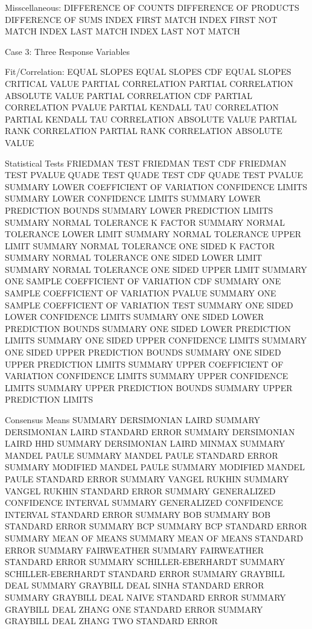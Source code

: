 Misscellaneous:
   DIFFERENCE OF COUNTS
   DIFFERENCE OF PRODUCTS
   DIFFERENCE OF SUMS
   INDEX FIRST MATCH
   INDEX FIRST NOT MATCH
   INDEX LAST MATCH
   INDEX LAST NOT MATCH

Case 3: Three Response Variables

Fit/Correlation:
   EQUAL SLOPES
   EQUAL SLOPES CDF
   EQUAL SLOPES CRITICAL VALUE
   PARTIAL CORRELATION
   PARTIAL CORRELATION ABSOLUTE VALUE
   PARTIAL CORRELATION CDF
   PARTIAL CORRELATION PVALUE
   PARTIAL KENDALL TAU CORRELATION
   PARTIAL KENDALL TAU CORRELATION ABSOLUTE VALUE
   PARTIAL RANK CORRELATION
   PARTIAL RANK CORRELATION ABSOLUTE VALUE

Statistical Tests
   FRIEDMAN TEST
   FRIEDMAN TEST CDF
   FRIEDMAN TEST PVALUE
   QUADE TEST
   QUADE TEST CDF
   QUADE TEST PVALUE
   SUMMARY LOWER COEFFICIENT OF VARIATION CONFIDENCE LIMITS
   SUMMARY LOWER CONFIDENCE LIMITS
   SUMMARY LOWER PREDICTION BOUNDS
   SUMMARY LOWER PREDICTION LIMITS
   SUMMARY NORMAL TOLERANCE K FACTOR
   SUMMARY NORMAL TOLERANCE LOWER LIMIT
   SUMMARY NORMAL TOLERANCE UPPER LIMIT
   SUMMARY NORMAL TOLERANCE ONE SIDED K FACTOR
   SUMMARY NORMAL TOLERANCE ONE SIDED LOWER LIMIT
   SUMMARY NORMAL TOLERANCE ONE SIDED UPPER LIMIT
   SUMMARY ONE SAMPLE COEFFICIENT OF VARIATION CDF
   SUMMARY ONE SAMPLE COEFFICIENT OF VARIATION PVALUE
   SUMMARY ONE SAMPLE COEFFICIENT OF VARIATION TEST
   SUMMARY ONE SIDED LOWER CONFIDENCE LIMITS
   SUMMARY ONE SIDED LOWER PREDICTION BOUNDS
   SUMMARY ONE SIDED LOWER PREDICTION LIMITS
   SUMMARY ONE SIDED UPPER CONFIDENCE LIMITS
   SUMMARY ONE SIDED UPPER PREDICTION BOUNDS
   SUMMARY ONE SIDED UPPER PREDICTION LIMITS
   SUMMARY UPPER COEFFICIENT OF VARIATION CONFIDENCE LIMITS
   SUMMARY UPPER CONFIDENCE LIMITS
   SUMMARY UPPER PREDICTION BOUNDS
   SUMMARY UPPER PREDICTION LIMITS

Consensus Means
   SUMMARY DERSIMONIAN LAIRD
   SUMMARY DERSIMONIAN LAIRD STANDARD ERROR
   SUMMARY DERSIMONIAN LAIRD HHD
   SUMMARY DERSIMONIAN LAIRD MINMAX
   SUMMARY MANDEL PAULE
   SUMMARY MANDEL PAULE STANDARD ERROR
   SUMMARY MODIFIED MANDEL PAULE
   SUMMARY MODIFIED MANDEL PAULE STANDARD ERROR
   SUMMARY VANGEL RUKHIN
   SUMMARY VANGEL RUKHIN STANDARD ERROR
   SUMMARY GENERALIZED CONFIDENCE INTERVAL
   SUMMARY GENERALIZED CONFIDENCE INTERVAL STANDARD ERROR
   SUMMARY BOB
   SUMMARY BOB STANDARD ERROR
   SUMMARY BCP
   SUMMARY BCP STANDARD ERROR
   SUMMARY MEAN OF MEANS
   SUMMARY MEAN OF MEANS STANDARD ERROR
   SUMMARY FAIRWEATHER
   SUMMARY FAIRWEATHER STANDARD ERROR
   SUMMARY SCHILLER-EBERHARDT
   SUMMARY SCHILLER-EBERHARDT STANDARD ERROR
   SUMMARY GRAYBILL DEAL
   SUMMARY GRAYBILL DEAL SINHA STANDARD ERROR
   SUMMARY GRAYBILL DEAL NAIVE STANDARD ERROR
   SUMMARY GRAYBILL DEAL ZHANG ONE STANDARD ERROR
   SUMMARY GRAYBILL DEAL ZHANG TWO STANDARD ERROR

